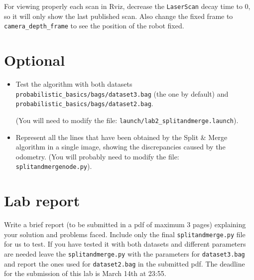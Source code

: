 \documentclass[a4paper,10pt]{article}
\begin{document}
For viewing properly each scan in Rviz, decrease the \texttt{LaserScan} decay time to 0, so it will only show the last published scan. Also change the fixed frame to \texttt{camera\_depth\_frame} to see the position of the robot fixed.

\section{Optional}
\begin{itemize}
    \item Test the algorithm with both datasets \texttt{probabilistic\_basics/bags/dataset3.bag} (the one by default) and \texttt{probabilistic\_basics/bags/dataset2.bag}.
    
    (You will need to modify the file:    \texttt{launch/lab2\_splitandmerge.launch}).
    \item Represent all the lines that have been obtained by the Split \& Merge algorithm in a single image, showing the discrepancies caused by the odometry. (You will probably need to modify the file: \texttt{splitandmergenode.py}).
\end{itemize}

\section{Lab report}

Write a brief report (to be submitted in a pdf of maximum 3 pages) explaining your solution and problems faced. Include only the final \texttt{splitandmerge.py} file for us to test. If you have tested it with both datasets and different parameters are needed leave the \texttt{splitandmerge.py} with the parameters for \texttt{dataset3.bag} and report the ones used for \texttt{dataset2.bag} in the submitted pdf. The deadline for the submission of this lab is March 14th at 23:55.
\end{document}
